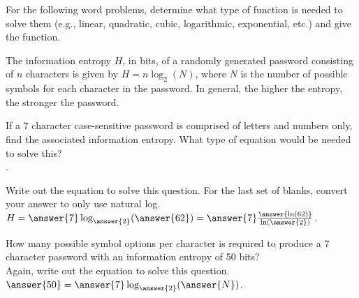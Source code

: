 \documentclass{ximera}
\author{Elizabeth Campolongo}
\begin{document}
\begin{exercise}
For the following word problems, determine what type of function is needed to solve them (e.g., linear, quadratic, cubic, logarithmic, exponential, etc.) and give the function. 
%


\item The information entropy $H$, in bits, of a randomly generated password consisting
of $n$ characters is given by $H = n\log_2(N)$, where $N$ is the number of possible symbols for each
character in the password. In general, the higher the entropy, the stronger the password.

If a 7 character case-sensitive password is comprised of letters and numbers only, find the
associated information entropy.
What type of equation would be needed to solve this?\\
.
\begin{exercise}
Write out the equation to solve this question. For the last set of blanks, convert your answer to only use natural log.\\
$H = \answer{7}\log_{\answer{2}}(\answer{62}) = \answer{7}\frac{\answer{\ln(62)}}{\ln(\answer{2})}$.

\begin{exercise}
How many possible symbol options per character is required to produce a 7 character password
with an information entropy of 50 bits?\\
Again, write out the equation to solve this question.\\
$\answer{50} = \answer{7}\log_{\answer{2}}(\answer{N})$.
\end{exercise}
\end{exercise}


\end{exercise}
\end{document}
